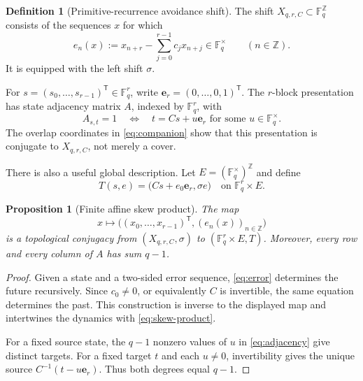 \documentclass[11pt,a4paper]{amsart}
\newtheorem{proposition}[theorem]{Proposition}
\theoremstyle{definition}
\newtheorem{definition}[theorem]{Definition}
\theoremstyle{remark}
\newcommand{\F}{\mathbb F}
\newcommand{\Z}{\mathbb Z}
\begin{document}
\begin{definition}[Primitive-recurrence avoidance shift]
The shift $X_{q,r,C}\subset\F_q^{\Z}$ consists of the sequences $x$ for
which
\begin{equation}\label{eq:error}
 e_n(x):=x_{n+r}-\sum_{j=0}^{r-1}c_jx_{n+j}\in\F_q^{\times}
 \qquad(n\in\Z).
\end{equation}
It is equipped with the left shift $\sigma$.
\end{definition}

For $s=(s_0,\ldots,s_{r-1})^{\mathsf T}\in\F_q^r$, write
$\mathbf e_r=(0,\ldots,0,1)^{\mathsf T}$.  The $r$-block presentation has
state adjacency matrix $A$, indexed by $\F_q^r$, with
\begin{equation}\label{eq:adjacency}
 A_{s,t}=1
 \quad\Longleftrightarrow\quad
 t=Cs+u\mathbf e_r\text{ for some }u\in\F_q^{\times}.
\end{equation}
The overlap coordinates in \eqref{eq:companion} show that this presentation
is conjugate to $X_{q,r,C}$, not merely a cover.

There is also a useful global description.  Let
$E=(\F_q^{\times})^{\Z}$ and define
\begin{equation}\label{eq:skew-product}
 T(s,e)=\bigl(Cs+e_0\mathbf e_r,\sigma e\bigr)
 \quad\text{on }\F_q^r\times E.
\end{equation}

\begin{proposition}[Finite affine skew product]
\label{prop:skew}
The map
\[
 x\longmapsto \bigl((x_0,\ldots,x_{r-1})^{\mathsf T},(e_n(x))_{n\in\Z}\bigr)
\]
is a topological conjugacy from $(X_{q,r,C},\sigma)$ to
$(\F_q^r\times E,T)$.  Moreover, every row and every column of $A$ has sum
$q-1$.
\end{proposition}

\begin{proof}
Given a state and a two-sided error sequence, \eqref{eq:error} determines
the future recursively.  Since $c_0\ne0$, or equivalently $C$ is invertible,
the same equation determines the past.  This construction is inverse to the
displayed map and intertwines the dynamics with \eqref{eq:skew-product}.

For a fixed source state, the $q-1$ nonzero values of $u$ in
\eqref{eq:adjacency} give distinct targets.  For a fixed target $t$ and each
$u\ne0$, invertibility gives the unique source
$C^{-1}(t-u\mathbf e_r)$.  Thus both degrees equal $q-1$.
\end{proof}
\end{document}
